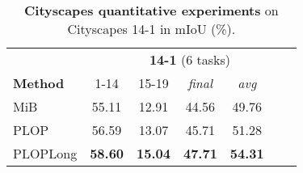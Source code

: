 \begin{table}[t]
    \centering
    \begin{tabular}{@{}l|cc|cccc@{}}
        \toprule
                                                      & \multicolumn{6}{c}{\textbf{14-1} (6 tasks)}                                                    \\
        \textbf{Method}                               & 1-14                                        & 15-19          & \textit{final} & \textit{avg}   \\
        \midrule
        MiB \citep{cermelli2020modelingthebackground} & 55.11                                       & 12.91          & 44.56          & 49.76          \\
        PLOP                                          & 56.59                                       & 13.07          & 45.71          & 51.28          \\
        PLOPLong                                      & \textbf{58.60}                              & \textbf{15.04} & \textbf{47.71} & \textbf{54.31} \\
        \bottomrule
    \end{tabular}
    \caption{\textbf{Cityscapes quantitative experiments} on Cityscapes 14-1 in \ac{mIoU} (\%).}
    \label{tab:seg_cityscapes_class}
\end{table}
